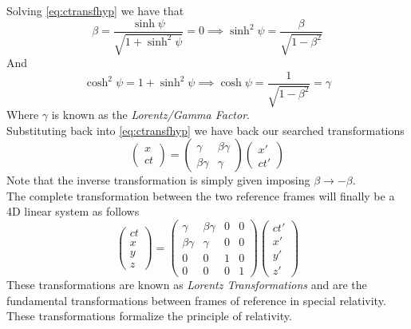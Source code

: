 \documentclass[../electromagnetism.tex]{subfiles}
\begin{document}
Solving \eqref{eq:ctransfhyp} we have that
\begin{equation}
	\beta=\frac{\sinh\psi}{\sqrt{1+\sinh^2\psi}}=0\implies\sinh^2\psi=\frac{\beta}{\sqrt{1-\beta^2}}
	\label{eq:sinh1}
\end{equation}
And
\begin{equation}
	\cosh^2\psi=1+\sinh^2\psi\implies\cosh\psi=\frac{1}{\sqrt{1-\beta^2}}=\gamma
	\label{eq:gammafactor}
\end{equation}
Where $\gamma$ is known as the \emph{Lorentz/Gamma Factor}.\\
Substituting back into \eqref{eq:ctransfhyp} we have back our searched transformations
\begin{equation}
	\begin{pmatrix}x\\ct\end{pmatrix}=\begin{pmatrix}\gamma&\beta\gamma\\\beta\gamma&\gamma\end{pmatrix}\begin{pmatrix}x'\\ct'\end{pmatrix}
	\label{eq:lorentzmatrix}
\end{equation}
Note that the inverse transformation is simply given imposing $\beta\to-\beta$.\\
The complete transformation between the two reference frames will finally be a 4D linear system as follows
\begin{equation}
	\begin{pmatrix}ct\\x\\y\\z\end{pmatrix}=\begin{pmatrix}\gamma&\beta\gamma&0&0\\\beta\gamma&\gamma&0&0\\0&0&1&0\\0&0&0&1\end{pmatrix}\begin{pmatrix}ct'\\x'\\y'\\z'\end{pmatrix}
	\label{eq:lorentztransformations}
\end{equation}
These transformations are known as \emph{Lorentz Transformations} and are the fundamental transformations between frames of reference in special relativity. These transformations formalize the principle of relativity.
\end{document}
